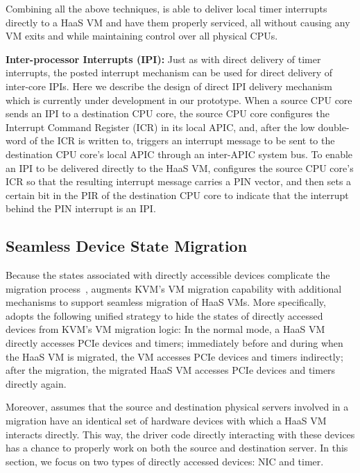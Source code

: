 Combining all the above techniques, \na is able to deliver local timer interrupts
directly to a HaaS VM and have them properly serviced,
all without causing any VM exits and while maintaining control over all physical CPUs.


{\bf Inter-processor Interrupts (IPI):}
Just as with direct delivery of timer interrupts, the posted interrupt mechanism can be used for direct delivery of inter-core IPIs.
Here we describe the design of direct IPI delivery mechanism which is currently under development in our prototype.
When a source CPU core sends an IPI to a destination CPU core, the source CPU core configures the Interrupt Command Register (ICR) in its local APIC,
and, after the low double-word of the ICR is written to, triggers an interrupt message to be sent to the destination CPU core's local APIC through an inter-APIC system bus.
To enable an IPI to be delivered directly to the HaaS VM, \na configures the source CPU core's ICR so that the resulting interrupt message carries a PIN vector,
and then sets a certain bit in the PIR of the destination CPU core to indicate that the interrupt behind the PIN interrupt is an IPI.




\subsection{Seamless Device State Migration}

Because the states associated with directly accessible devices complicate the migration process~\cite{zhai:2008},
\na augments KVM's VM migration capability with additional mechanisms to support seamless migration of HaaS VMs.
More specifically, \na adopts the following unified strategy to hide the states of directly accessed devices from KVM's VM migration logic:
In the normal mode, a HaaS VM directly accesses PCIe devices and timers; immediately before and during when the HaaS VM is migrated,  the VM
accesses PCIe devices and timers indirectly; after the migration, the migrated HaaS VM accesses PCIe devices and timers directly again.

Moreover, \na assumes that the source and destination physical servers involved in a migration have an identical
set of hardware devices with which a HaaS VM interacts directly.
This way, the driver code directly interacting with these devices has a chance to properly work on
both the source and destination server.
In this section, we focus on two types of directly accessed devices: NIC and timer.



